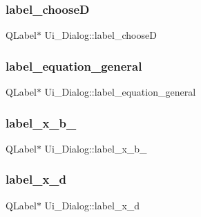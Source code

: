 \subsubsection{\texorpdfstring{label\+\_\+chooseD}{label\_chooseD}}
{\footnotesize\ttfamily Q\+Label$\ast$ Ui\+\_\+\+Dialog\+::label\+\_\+chooseD}

\hypertarget{class_ui___dialog_afdb95c03e64a971906bad7a49fbb887f}{}\label{class_ui___dialog_afdb95c03e64a971906bad7a49fbb887f} 
\subsubsection{\texorpdfstring{label\+\_\+equation\+\_\+general}{label\_equation\_general}}
{\footnotesize\ttfamily Q\+Label$\ast$ Ui\+\_\+\+Dialog\+::label\+\_\+equation\+\_\+general}

\hypertarget{class_ui___dialog_a60553ee369483b9b346c5ad7377765e2}{}\label{class_ui___dialog_a60553ee369483b9b346c5ad7377765e2} 
\subsubsection{\texorpdfstring{label\+\_\+x\+\_\+b\+\_}{label\_x\_b\_2}}
{\footnotesize\ttfamily Q\+Label$\ast$ Ui\+\_\+\+Dialog\+::label\+\_\+x\+\_\+b\+\_}

\hypertarget{class_ui___dialog_a24bc1d94076a61c599e0626cce0ecbff}{}\label{class_ui___dialog_a24bc1d94076a61c599e0626cce0ecbff} 
\subsubsection{\texorpdfstring{label\+\_\+x\+\_\+d}{label\_x\_d}}
{\footnotesize\ttfamily Q\+Label$\ast$ Ui\+\_\+\+Dialog\+::label\+\_\+x\+\_\+d}

\hypertarget{class_ui___dialog_a0fced57090e5ac447ac60756bc36a68d}{}\label{class_ui___dialog_a0fced57090e5ac447ac60756bc36a68d} 
